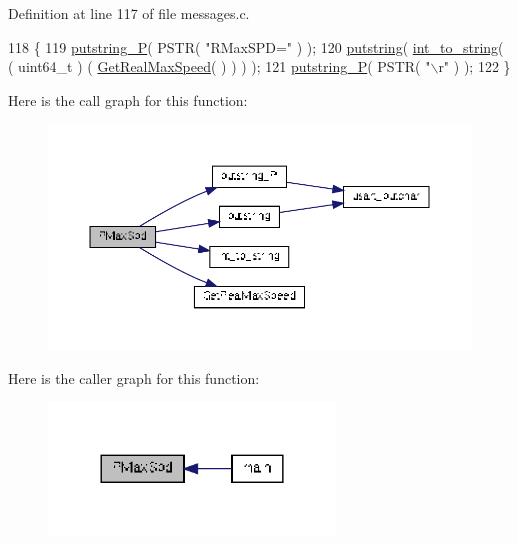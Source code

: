 Definition at line 117 of file messages.\-c.


\begin{DoxyCode}
118 \{
119     \hyperlink{group__biba__utils_gaf1b54c4c5b890362b485636395859b3d}{putstring\_P}( PSTR( \textcolor{stringliteral}{"RMaxSPD="} ) );
120     \hyperlink{group__biba__utils_ga354be7728c1265a82ba2510f1800cea4}{putstring}( \hyperlink{group__biba__utils_ga3d33c2ff89043a4bf00d652d182dfc27}{int\_to\_string}( ( uint64\_t ) ( 
      \hyperlink{group__biba__drv_ga20bfcaca6af265d5f8b2dc50f3a26779}{GetRealMaxSpeed}( ) ) ) );
121     \hyperlink{group__biba__utils_gaf1b54c4c5b890362b485636395859b3d}{putstring\_P}( PSTR( \textcolor{stringliteral}{"\(\backslash\)r"} ) );
122 \}
\end{DoxyCode}


Here is the call graph for this function\-:
\nopagebreak
\begin{figure}[H]
\begin{center}
\leavevmode
\includegraphics[width=350pt]{group__biba__messges_ga1cee417b557775a8a769eb5bc2306f08_cgraph}
\end{center}
\end{figure}




Here is the caller graph for this function\-:
\nopagebreak
\begin{figure}[H]
\begin{center}
\leavevmode
\includegraphics[width=216pt]{group__biba__messges_ga1cee417b557775a8a769eb5bc2306f08_icgraph}
\end{center}
\end{figure}


